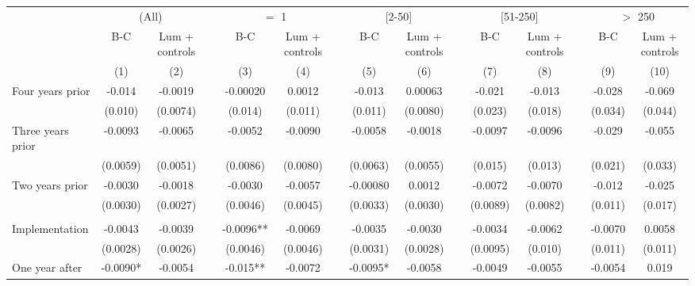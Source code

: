 \begin{tabular}{lcccccccccccccc}
\toprule
      & \multicolumn{2}{c}{(All)} &       & \multicolumn{2}{c}{$=$ 1} &       & \multicolumn{2}{c}{[2-50]} &       & \multicolumn{2}{c}{[51-250]} &       & \multicolumn{2}{c}{$>$ 250} \\
\cmidrule{2-3}\cmidrule{5-6}\cmidrule{8-9}\cmidrule{11-12}\cmidrule{14-15}      & B-C   & Lum + controls &       & B-C   & Lum + controls &       & B-C   & Lum + controls &       & B-C   & Lum + controls &       & B-C   & Lum + controls \\
\midrule
      & (1)   & (2)   &       & (3)   & (4)   &       & (5)   & (6)   &       & (7)   & (8)   &       & (9)   & (10) \\
\midrule
\midrule
Four years prior & -0.014 & -0.0019 &       & -0.00020 & 0.0012 &       & -0.013 & 0.00063 &       & -0.021 & -0.013 &       & -0.028 & -0.069 \\
      & (0.010) & (0.0074) &       & (0.014) & (0.011) &       & (0.011) & (0.0080) &       & (0.023) & (0.018) &       & (0.034) & (0.044) \\
Three years prior & -0.0093 & -0.0065 &       & -0.0052 & -0.0090 &       & -0.0058 & -0.0018 &       & -0.0097 & -0.0096 &       & -0.029 & -0.055 \\
      & (0.0059) & (0.0051) &       & (0.0086) & (0.0080) &       & (0.0063) & (0.0055) &       & (0.015) & (0.013) &       & (0.021) & (0.033) \\
Two years prior & -0.0030 & -0.0018 &       & -0.0030 & -0.0057 &       & -0.00080 & 0.0012 &       & -0.0072 & -0.0070 &       & -0.012 & -0.025 \\
      & (0.0030) & (0.0027) &       & (0.0046) & (0.0045) &       & (0.0033) & (0.0030) &       & (0.0089) & (0.0082) &       & (0.011) & (0.017) \\
      &       &       &       &       &       &       &       &       &       &       &       &       &       &  \\
Implementation & -0.0043 & -0.0039 &       & -0.0096** & -0.0069 &       & -0.0035 & -0.0030 &       & -0.0034 & -0.0062 &       & -0.0070 & 0.0058 \\
      & (0.0028) & (0.0026) &       & (0.0046) & (0.0046) &       & (0.0031) & (0.0028) &       & (0.0095) & (0.010) &       & (0.011) & (0.011) \\
One year after & -0.0090* & -0.0054 &       & -0.015** & -0.0072 &       & -0.0095* & -0.0058 &       & -0.0049 & -0.0055 &       & -0.0054 & 0.019 \\

\end{tabular}

